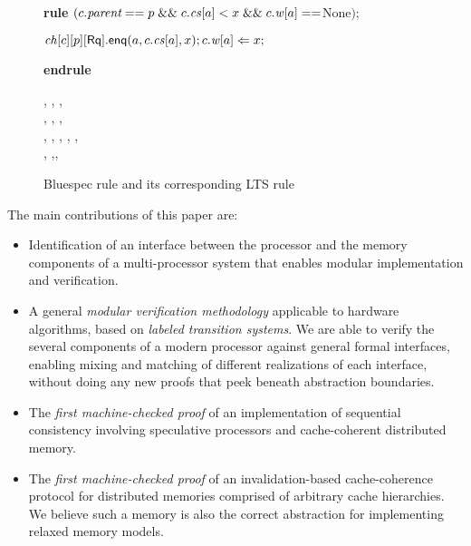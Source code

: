 \begin{figure}[t]
\centering
\begin{boxedminipage}{\columnwidth}
\small
\noindent \textbf{rule} $(c.\textit{parent} == p \; \mathit{\&\&} \; c.\mathit{cs}[a] < x \; \mathit{\&\&} \; c.\mathit{w}[a]==$None$);$

\hspace{1cm} $\mathit{ch}[c][p][\mathsf{Rq}].\mathsf{enq}(a,c.\mathit{cs}[a],x); c.\mathit{w}[a] \Leftarrow x;$

\textbf{endrule}
\end{boxedminipage}
\begin{boxedminipage}{\columnwidth}
\small
{}
{
{\dt, \ch, \s,\\ \dst, \wt, \dwt,\\ \inp, \outp}
{\dt, , \s, \dst,\\
\wt[(c,a)\coloneqq x], \dwt,\inp, \outp}{}}
\end{boxedminipage}
\caption{Bluespec rule and its corresponding LTS rule}
\label{both}
\end{figure}

The main contributions of this paper are:

\begin{itemize} 
\item Identification of an interface between the processor and the memory
components of a multi-processor system that enables modular implementation and
verification.

\item A general \emph{modular verification methodology} applicable to hardware
algorithms, based on \emph{labeled transition systems}.  We are able to verify
the several components of a modern processor against general formal interfaces,
enabling mixing and matching of different realizations of each interface,
without doing any new proofs that peek beneath abstraction boundaries.

\item The \emph{first machine-checked proof} of an implementation of sequential
consistency involving speculative processors and cache-coherent distributed
memory.

\item The \emph{first machine-checked proof} of an invalidation-based
cache-coherence protocol for distributed memories comprised of arbitrary cache
hierarchies. We believe such a memory is also the correct abstraction for
implementing relaxed memory models.
\end{itemize}

